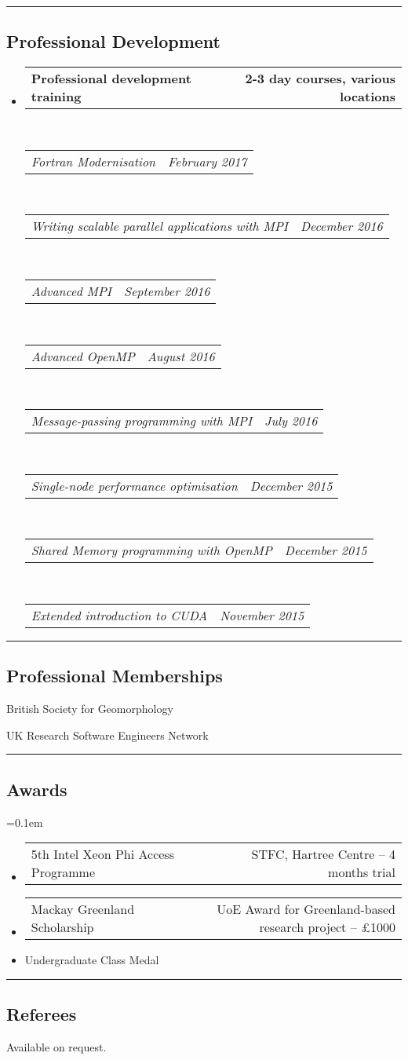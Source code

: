 \documentclass[10.5pt,a4]{article}
\makeatletter
\newenvironment{indentsection}[1]%
{\begin{list}{}%
	{\setlength{\leftmargin}{#1}}%
	\item[]%
}
{\end{list}}
\newcommand{\headerrow}[2]
{\begin{tabular*}{\linewidth}{l@{\extracolsep{\fill}}r}
	#1 &
	#2 \\
\end{tabular*}}
\makeatother
\begin{document}
\hrule
\vspace{-0.4em}
\subsection*{Professional Development}
\begin{itemize}
	\item 
	\headerrow
		{\textbf{Professional development training}}
		{\textbf{2-3 day courses, various locations}}
	\\
		\headerrow
		{\emph{Fortran Modernisation}}
		{\emph{February 2017}}
	\\
	\headerrow
		{\emph{Writing scalable parallel applications with MPI}}
		{\emph{December 2016}}
	\\
	\headerrow
		{\emph{Advanced MPI}}
		{\emph{September 2016}}
		\\
	\headerrow
		{\emph{Advanced OpenMP}}
		{\emph{August 2016}}
	\\
	\headerrow
		{\emph{Message-passing programming with MPI}}
		{\emph{July 2016}}
	\\
	\headerrow
		{\emph{Single-node performance optimisation}}
		{\emph{December 2015}}
	\\
	\headerrow
		{\emph{Shared Memory programming with OpenMP}}
		{\emph{December 2015}}
	\\
	\headerrow
		{\emph{Extended introduction to CUDA}}
		{\emph{November 2015}}
\end{itemize}

\hrule
\vspace{-0.4em}
\subsection*{Professional Memberships}

	\begin{itemize*}
	\item British Society for Geomorphology
	\item UK Research Software Engineers Network
	\end{itemize*}

\hrule
\vspace{-0.4em}
\subsection*{Awards}
	\parskip=0.1em
\begin{itemize}

	\item 
	\headerrow 
	  {5th Intel Xeon Phi Access Programme}
	  {STFC, Hartree Centre -- 4 months trial}

	\item
	\headerrow
		 {Mackay Greenland Scholarship}
		 {UoE Award for Greenland-based research project -- £1000}
	\item Undergraduate Class Medal


\end{itemize}


\hrule
\vspace{-0.4em}
\subsection*{Referees}



\begin{indentsection}{\parindent}

Available on request.
\end{indentsection}
\end{document}
